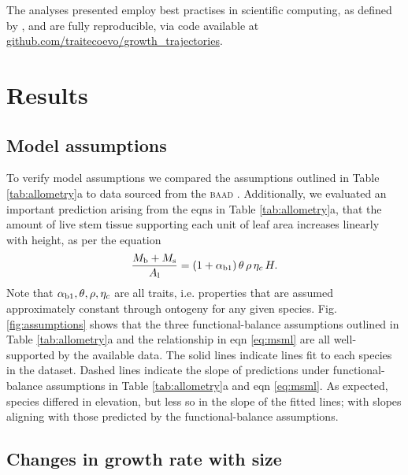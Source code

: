\documentclass[a4paper,11pt]{article}
\begin{document}
The analyses presented employ best practises in scientific computing, as defined by \citet{Wilson-2014}, and are fully reproducible, via code available at
\href{https://github.com/traitecoevo/growth\_trajectories}{github.com/traitecoevo/growth\_trajectories}.

\section{Results}

\subsection{Model assumptions}

To verify model assumptions we compared the assumptions outlined in Table \ref{tab:allometry}a to data sourced from the \textsc{baad} \citep{Falster-2015b}. Additionally, we evaluated an important prediction arising from the eqns in Table \ref{tab:allometry}a, that the amount of live stem tissue supporting each unit of leaf area increases linearly with height, as per the equation
\begin{equation}\label{eq:msml}
\frac{M_{\rm b} + M_{\rm s}}{A_{\rm l}} = (1+ \alpha_{\rm b1}) \,\theta \, \rho \, \eta_c \, H.
\end{equation}
Note that $\alpha_{\rm b1}, \theta, \rho, \eta_c$ are all traits, i.e. properties that are assumed approximately constant through ontogeny for any given species. Fig. \ref{fig:assumptions} shows that the three functional-balance assumptions outlined in Table \ref{tab:allometry}a and the relationship in eqn \ref{eq:msml} are all well-supported by the available data. The solid lines indicate {\sma} lines fit to each species in the dataset. Dashed lines indicate the slope of predictions under functional-balance assumptions in Table \ref{tab:allometry}a and eqn \ref{eq:msml}. As expected, species differed in elevation, but less so in the slope of the fitted lines; with slopes aligning with those predicted by the functional-balance assumptions.

\subsection{Changes in growth rate with size}
\end{document}

